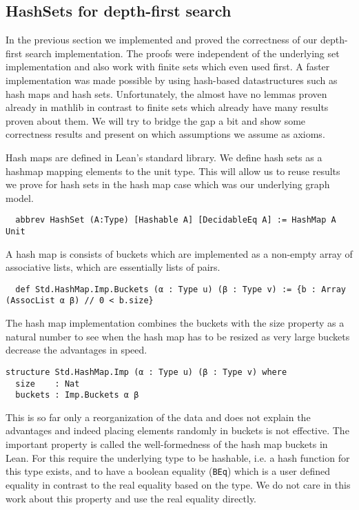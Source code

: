 \subsection{HashSets for depth-first search}

In the previous section we implemented and proved the correctness of our depth-first search implementation. The proofs were independent of the underlying set implementation and also work with finite sets which even used first. A faster implementation was made possible by using hash-based datastructures such as hash maps and hash sets. Unfortunately, the almost have no lemmas proven already in mathlib in contrast to finite sets which already have many results proven about them. We will try to bridge the gap a bit and show some correctness results and present on which assumptions we assume as axioms. 

Hash maps are defined in Lean's standard library. We define hash sets as a hashmap mapping elements to the unit type. This will allow us to reuse results we prove for hash sets in the hash map case which was our underlying graph model.

\begin{lstlisting}
  abbrev HashSet (A:Type) [Hashable A] [DecidableEq A] := HashMap A Unit
\end{lstlisting}

A hash map is consists of buckets which are implemented as a non-empty array of associative lists, which are essentially lists of pairs.

\begin{lstlisting}
  def Std.HashMap.Imp.Buckets (α : Type u) (β : Type v) := {b : Array (AssocList α β) // 0 < b.size}
\end{lstlisting}

The hash map implementation combines the buckets with the size property as a natural number to see when the hash map has to be resized as very large buckets decrease the advantages in speed. 

\begin{lstlisting}
structure Std.HashMap.Imp (α : Type u) (β : Type v) where
  size    : Nat
  buckets : Imp.Buckets α β
\end{lstlisting}

This is so far only a reorganization of the data and does not explain the advantages and indeed placing elements randomly in buckets is not effective. The important property is called the well-formedness of the hash map buckets in Lean. For this require the underlying type to be hashable, i.e. a hash function for this type exists, and to have a boolean equality (\lstinline|BEq|) which is a user defined equality in contrast to the real equality based on the type. We do not care in this work about this property and use the real equality directly.

